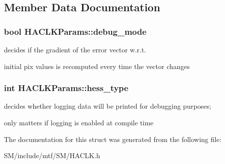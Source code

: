 \subsection{Member Data Documentation}
\hypertarget{structHACLKParams_ae1b1aafcc9c2b966be957699c92f228a}{
\subsubsection[{debug\-\_\-mode}]{\setlength{\rightskip}{0pt plus 5cm}bool H\-A\-C\-L\-K\-Params\-::debug\-\_\-mode}}\label{structHACLKParams_ae1b1aafcc9c2b966be957699c92f228a}


decides if the gradient of the error vector w.\-r.\-t. 

initial pix values is recomputed every time the vector changes \hypertarget{structHACLKParams_a1acbdb628145c0aedddce3c6ea0f2c74}{
\subsubsection[{hess\-\_\-type}]{\setlength{\rightskip}{0pt plus 5cm}int H\-A\-C\-L\-K\-Params\-::hess\-\_\-type}}\label{structHACLKParams_a1acbdb628145c0aedddce3c6ea0f2c74}


decides whether logging data will be printed for debugging purposes; 

only matters if logging is enabled at compile time 

The documentation for this struct was generated from the following file\-:\begin{DoxyCompactItemize}
\item 
S\-M/include/mtf/\-S\-M/H\-A\-C\-L\-K.\-h\end{DoxyCompactItemize}
